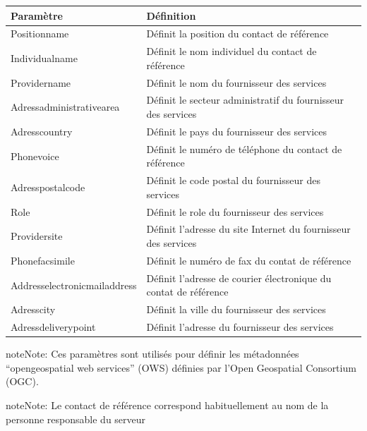 \documentclass[letterpaper,10pt,french]{sphinxmanual}
\begin{document}
\begin{tabulary}{\linewidth}{|L|L|}
\hline

\textbf{Paramètre}
 & 
\textbf{Définition}
\\
\hline
Positionname
 & 
Définit la position du contact de référence
\\
\hline
Individualname
 & 
Définit le nom individuel du contact de référence
\\
\hline
Providername
 & 
Définit le nom du fournisseur des services
\\
\hline
Adressadministrativearea
 & 
Définit le secteur administratif du fournisseur des services
\\
\hline
Adresscountry
 & 
Définit le pays du fournisseur des services
\\
\hline
Phonevoice
 & 
Définit le numéro de téléphone du contact de référence
\\
\hline
Adresspostalcode
 & 
Définit le code postal du fournisseur des services
\\
\hline
Role
 & 
Définit le role du fournisseur des services
\\
\hline
Providersite
 & 
Définit l'adresse du site Internet du fournisseur des services
\\
\hline
Phonefacsimile
 & 
Définit le numéro de fax du contat de référence
\\
\hline
Addresselectronicmailaddress
 & 
Définit l'adresse de courier électronique du contat de référence
\\
\hline
Adresscity
 & 
Définit la ville du fournisseur des services
\\
\hline
Adressdeliverypoint
 & 
Définit l'adresse du fournisseur des services
\\
\hline\end{tabulary}


\begin{notice}{note}{Note:}
Ces paramètres sont utilisés pour définir les métadonnées ``opengeospatial web services'' (OWS) définies par l'Open Geospatial Consortium  (OGC).
\end{notice}

\begin{notice}{note}{Note:}
Le contact de référence correspond habituellement au nom de la personne responsable du serveur
\end{notice}
\end{document}
